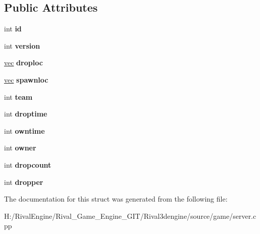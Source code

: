 \subsection*{Public Attributes}
\begin{DoxyCompactItemize}
\item 
\mbox{\label{structserver_1_1ctfservmode_1_1flag_a9872994fb4cd07f744f9567905588af3}} 
int {\bfseries id}
\item 
\mbox{\label{structserver_1_1ctfservmode_1_1flag_a95ac67e3b80d4eb397687a1dd1fb6880}} 
int {\bfseries version}
\item 
\mbox{\label{structserver_1_1ctfservmode_1_1flag_ab06265abf0f8da3f98b26e2c75731fb0}} 
\hyperlink{structvec}{vec} {\bfseries droploc}
\item 
\mbox{\label{structserver_1_1ctfservmode_1_1flag_a29a3024f10d4b82b5741372f501327e4}} 
\hyperlink{structvec}{vec} {\bfseries spawnloc}
\item 
\mbox{\label{structserver_1_1ctfservmode_1_1flag_a81ff28e7eecdfa7864656839903fdcde}} 
int {\bfseries team}
\item 
\mbox{\label{structserver_1_1ctfservmode_1_1flag_a37ef955b71e5bb6d5993e640d9738f9a}} 
int {\bfseries droptime}
\item 
\mbox{\label{structserver_1_1ctfservmode_1_1flag_a981ba8ab7b0dd7f5da9de2320ebf4d43}} 
int {\bfseries owntime}
\item 
\mbox{\label{structserver_1_1ctfservmode_1_1flag_a42ba45f1b657132547d019c69e2828d7}} 
int {\bfseries owner}
\item 
\mbox{\label{structserver_1_1ctfservmode_1_1flag_a46d02fd0ea807adc371793fef2fc214a}} 
int {\bfseries dropcount}
\item 
\mbox{\label{structserver_1_1ctfservmode_1_1flag_af62ed239084261f14803c788ce81332b}} 
int {\bfseries dropper}
\end{DoxyCompactItemize}


The documentation for this struct was generated from the following file\+:\begin{DoxyCompactItemize}
\item 
H\+:/\+Rival\+Engine/\+Rival\+\_\+\+Game\+\_\+\+Engine\+\_\+\+G\+I\+T/\+Rival3dengine/source/game/server.\+cpp\end{DoxyCompactItemize}
